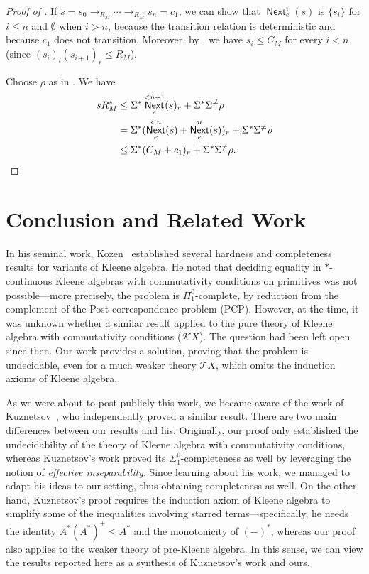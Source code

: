 \documentclass[11pt,a4paper]{amsart}
\theoremstyle{definition}
\DeclareMathOperator{\Next}{\mathsf{Next}}
\begin{document}
\begin{proof}[Proof of ]
  If $s = s_0  \to _{R_M}  \cdots   \to _{R_M} s_n = c_1$, we can show that $\Next_e^i(s)$ is
  $\{s_i\}$ for $i  \leq  n$ and $ \emptyset $ when $i > n$, because the transition relation is
  deterministic and because $c_1$ does not transition.  Moreover, by
  , we have $s_i  \leq  C_M$ for every $i < n$
  (since $(s_i)_l(s_{i+1})_r  \leq  R_M$).

  Choose $ \rho $ as in . We have
  \begin{align*}
    sR_M^*
    &  \leq   \Sigma ^*\Next_e^{<n+1}(s)_r +  \Sigma ^* \Sigma ^{ \neq } \rho  \\
    & =  \Sigma ^*(\Next_e^{<n}(s) + \Next_e^n(s))_r +  \Sigma ^* \Sigma ^{ \neq } \rho  \\
    &  \leq   \Sigma ^*(C_M + c_1)_r +  \Sigma ^* \Sigma ^{ \neq } \rho . \qedhere
  \end{align*}
\end{proof}


\section{Conclusion and Related Work}
\label{sec:conclusion}

In his seminal work, Kozen~\cite{DBLP:conf/lics/Kozen97} established several
hardness and completeness results for variants of Kleene algebra.  He noted that
deciding equality in $*$-continuous Kleene algebras with commutativity
conditions on primitives was not possible---more precisely, the problem is
$ \Pi _1^0$-complete, by reduction from the complement of the Post
correspondence problem (PCP).  However, at the time, it was unknown whether a
similar result applied to the pure theory of Kleene algebra with commutativity
conditions ($\mathcal{K}X$).  The question had been left open since then. Our
work provides a solution, proving that the problem is undecidable, even for a
much weaker theory $\mathcal{T}X$, which omits the induction axioms of Kleene
algebra.

As we were about to post publicly this work, we became aware of the work of
Kuznetsov~\cite{Kuznetsov23}, who independently proved a similar result.  There
are two main differences between our results and his.  Originally, our proof
only established the undecidability of the theory of Kleene algebra with
commutativity conditions, whereas Kuznetsov's work proved its
$\Sigma^0_1$-completeness as well by leveraging the notion of \emph{effective
  inseparability}.  Since learning about his work, we managed to adapt his ideas
to our setting, thus obtaining completeness as well.  On the other hand,
Kuznetsov's proof requires the induction axiom of Kleene algebra to simplify
some of the inequalities involving starred terms---specifically, he needs the
identity $A^*(A^*)^+ \leq A^*$ and the monotonicity of $(-)^*$, whereas our
proof also applies to the weaker theory of pre-Kleene algebra.  In this sense,
we can view the results reported here as a synthesis of Kuznetsov's work and
ours.
\end{document}
